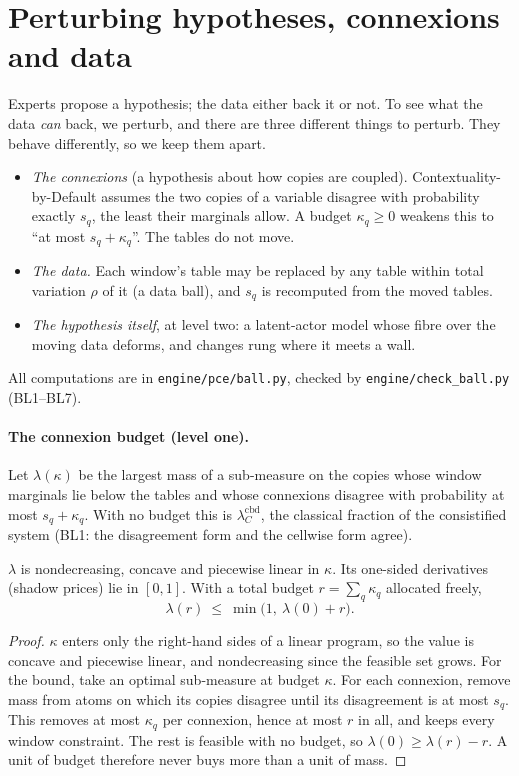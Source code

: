 \documentclass[11pt]{article}
\theoremstyle{definition}\newtheorem{definition}[theorem]{Definition}\newtheorem{remark}[theorem]{Remark}\newtheorem{example}[theorem]{Example}
\begin{document}
\section{Perturbing hypotheses, connexions and data}\label{sec:ball}

Experts propose a hypothesis; the data either back it or not. To see what the data \emph{can} back, we perturb, and there are three
different things to perturb. They behave differently, so we keep them apart.
\begin{itemize}
\item \emph{The connexions} (a hypothesis about how copies are coupled). Contextuality-by-Default assumes the two copies of a variable
  disagree with probability exactly $s_q$, the least their marginals allow. A budget $\kappa_q\ge0$ weakens this to ``at most
  $s_q+\kappa_q$''. The tables do not move.
\item \emph{The data.} Each window's table may be replaced by any table within total variation $\rho$ of it (a data ball), and $s_q$ is
  recomputed from the moved tables.
\item \emph{The hypothesis itself}, at level two: a latent-actor model whose fibre over the moving data deforms, and changes rung where it
  meets a wall.
\end{itemize}
All computations are in \texttt{engine/pce/ball.py}, checked by \texttt{engine/check\_ball.py} (BL1--BL7).

\paragraph{The connexion budget (level one).}
Let $\lambda(\kappa)$ be the largest mass of a sub-measure on the copies whose window marginals lie below the tables and whose connexions
disagree with probability at most $s_q+\kappa_q$. With no budget this is $\lambda_C^{\mathrm{cbd}}$, the classical fraction of the
consistified system (BL1: the disagreement form and the cellwise form agree).

\begin{proposition}\label{prop:budget}
$\lambda$ is nondecreasing, concave and piecewise linear in $\kappa$. Its one-sided derivatives (shadow prices) lie in $[0,1]$. With a
total budget $r=\sum_q\kappa_q$ allocated freely,
\[\lambda(r)\ \le\ \min\bigl(1,\ \lambda(0)+r\bigr).\]
\end{proposition}

\begin{proof}
$\kappa$ enters only the right-hand sides of a linear program, so the value is concave and piecewise linear, and nondecreasing since
the feasible set grows. For the bound, take an optimal sub-measure at budget $\kappa$. For each connexion, remove mass from atoms on which
its copies disagree until its disagreement is at most $s_q$. This removes at most $\kappa_q$ per connexion, hence at most $r$ in all,
and keeps every window constraint. The rest is feasible with no budget, so $\lambda(0)\ge\lambda(r)-r$. A unit of budget therefore never
buys more than a unit of mass.
\end{proof}
\end{document}
